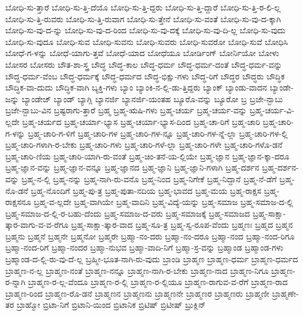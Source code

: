 {ಬೋಧಿ-ಸು-ತ್ತಾರೆ
ಬೋಧಿ-ಸು-ತ್ತಿ-ದೆಯೊ
ಬೋಧಿ-ಸು-ತ್ತಿ-ದ್ದರು
ಬೋಧಿ-ಸು-ತ್ತಿ-ದ್ದಾರೆ
ಬೋಧಿ-ಸು-ತ್ತಿ-ರ-ಲಿ-ಲ್ಲ
ಬೋಧಿ-ಸು-ತ್ತಿ-ರುವರು
ಬೋಧಿ-ಸು-ತ್ತಿ-ರುವಾಗ
ಬೋಧಿ-ಸು-ತ್ತೇನೆ
ಬೋಧಿ-ಸು-ವಂತೆ
ಬೋಧಿ-ಸು-ವು-ದ-ಕ್ಕಾಗಿ
ಬೋಧಿ-ಸು-ವು-ದ-ನ್ನು
ಬೋಧಿ-ಸು-ವು-ದ-ರಿಂದ
ಬೋಧಿ-ಸು-ವು-ದಕ್ಕೆ
ಬೋಧಿ-ಸು-ವು-ದಿ-ಲ್ಲ
ಬೋಧಿ-ಸು-ವುದು
ಬೋಧಿ-ಸು-ವುದೂ
ಬೋಧಿ-ಸುವ
ಬೋಧಿ-ಸುವನು
ಬೋಧಿ-ಸುವರು
ಬೋಧಿ-ಸುವರೋ
ಬೋಧಿ-ಸುವೆ
ಬೋಧಿಸಿ
ಬೋಧೆ-ಗ-ಳನ್ನು
ಬೋಧೆ-ಯಾಗು-ತ್ತವೆ
ಬೋಧೆ-ಯಾದ
ಬೋಧೆಯೂ
ಬೋರ್ಡಿಂಗ್
ಬೋರ್ನಿಯೋ
ಬೋಳು
ಬೋಸರ
ಬೋಸರು
ಬೌತ-ಶಾ-ಸ್ತ್ರ
ಬೌದ್ಧ
ಬೌದ್ಧ-ಕಾಲ
ಬೌದ್ಧ-ಧರ್ಮ
ಬೌದ್ಧ-ಧರ್ಮ-ದಂತೆ
ಬೌದ್ಧ-ಧರ್ಮ-ವನ್ನು
ಬೌದ್ಧ-ಧರ್ಮ-ವೆಂಬ
ಬೌದ್ಧ-ಧರ್ಮಕ್ಕೆ
ಬೌದ್ಧ-ಧರ್ಮದ
ಬೌದ್ಧ-ಭಿಕ್ಷು-ಗಳು
ಬೌದ್ಧ-ರಿಗೆ
ಬೌದ್ಧರ
ಬೌದ್ಧರು
ಬೌದ್ಧಿಕ
ಬೌದ್ಧಿಕ-ವಾ-ದುದು
ಬೌದ್ಧಿಕ-ವಾಗಿ
ಬ್ಯಕ್ತಿ-ಗಳು
ಬ್ಯಾಂ
ಬ್ಯಾಂಕಿ-ನ-ಲ್ಲಿ-ಡು-ತ್ತಿದ್ದರು
ಬ್ಯಾಂಕ್
ಬ್ಯಾಂಡು-ವಾದನ
ಬ್ಯಾಂಡೇ-ಜನ್ನು
ಬ್ಯಾಂಡೇಜ್
ಬ್ಯಾಂಡ್
ಬ್ಯಾಗ್ಲಿ
ಬ್ಯಾನರ್ಜಿ
ಬ್ಯಾನರ್ಜಿ-ಯಂತಹ
ಬ್ಯೂರೊ-ವನ್ನು
ಬ್ಯೂರೋ
ಬ್ರ
ಬ್ರಜೇ-ನ್ಬಾಬು
ಬ್ರಜೇ-ನ್ಬಾಬು-ವಿನ
ಬ್ರಷ್ಟರಾಗು-ತ್ತಾರೆ
ಬ್ರಹ್ಮ
ಬ್ರಹ್ಮ-ಋಷಿ-ಗಳು
ಬ್ರಹ್ಮ-ಚರ್ಯ
ಬ್ರಹ್ಮ-ಚರ್ಯ-ವನ್ನು
ಬ್ರಹ್ಮ-ಚರ್ಯ-ವಿ-ಲ್ಲದೇ
ಬ್ರಹ್ಮ-ಚರ್ಯದ
ಬ್ರಹ್ಮ-ಚರ್ಯಾ-ಭ್ಯಾಸ
ಬ್ರಹ್ಮ-ಚರ್ಯಾ-ಭ್ಯಾಸ-ದಿಂದ
ಬ್ರಹ್ಮ-ಚಾ-ರಿಗೆ
ಬ್ರಹ್ಮ-ಚಾರಿ
ಬ್ರಹ್ಮ-ಚಾರಿ-ಗ-ಳನ್ನು
ಬ್ರಹ್ಮ-ಚಾರಿ-ಗ-ಳಿಗೆ
ಬ್ರಹ್ಮ-ಚಾರಿ-ಗಳ
ಬ್ರಹ್ಮ-ಚಾರಿ-ಗಳ-ನ್ನೂ
ಬ್ರಹ್ಮ-ಚಾರಿ-ಗಳ-ನ್ನೆ-ಲ್ಲಾ
ಬ್ರಹ್ಮ-ಚಾರಿ-ಗಳ-ಲ್ಲಿ
ಬ್ರಹ್ಮ-ಚಾರಿ-ಗಳಾಗಿ-ರ-ಬೇಕು
ಬ್ರಹ್ಮ-ಚಾರಿ-ಗಳು
ಬ್ರಹ್ಮ-ಚಾರಿ-ಗಳೆ-ಲ್ಲಾ
ಬ್ರಹ್ಮ-ಚಾರಿ-ಗಳೇ
ಬ್ರಹ್ಮ-ಚಾರಿ-ಗಳೊ-ಡನೆ
ಬ್ರಹ್ಮ-ಚಾರಿ-ಣಿಯ
ಬ್ರಹ್ಮ-ಚಾರಿ-ಯಾಗಿ-ರು-ವಂತೆ
ಬ್ರಹ್ಮ-ಚಿಂ-ತನೆ-ಯ-ಲ್ಲಿಯೇ
ಬ್ರಹ್ಮ-ಜ್ಞಾನ
ಬ್ರಹ್ಮ-ಜ್ಞಾನ-ಕ್ಕಾ-ದರೂ
ಬ್ರಹ್ಮ-ಜ್ಞಾನ-ವನ್ನು
ಬ್ರಹ್ಮ-ಜ್ಞಾನ-ವನ್ನೂ
ಬ್ರಹ್ಮ-ಜ್ಞಾನದ
ಬ್ರಹ್ಮ-ಜ್ಞಾನಿ
ಬ್ರಹ್ಮ-ಜ್ಞಾನಿ-ಗಳಾಗಿ
ಬ್ರಹ್ಮ-ದರ್ಶನ
ಬ್ರಹ್ಮ-ದರ್ಶನ-ವನ್ನು
ಬ್ರಹ್ಮ-ನ-ಲ್ಲಿ
ಬ್ರಹ್ಮ-ನನ್ನು
ಬ್ರಹ್ಮ-ನಾಗಿ-ರು-ವನೊ
ಬ್ರಹ್ಮ-ನಿಂದ
ಬ್ರಹ್ಮ-ನಿಗೇಕೆ
ಬ್ರಹ್ಮ-ನಿದ್ದಾನೆ
ಬ್ರಹ್ಮ-ನೆ-ಡೆಗೆ
ಬ್ರಹ್ಮ-ನೊ-ಡನೆ
ಬ್ರಹ್ಮ-ನೊಂದಿಗೆ
ಬ್ರಹ್ಮ-ಪು-ತ್ರ
ಬ್ರಹ್ಮ-ಪುತಾ-ನದಿಯ
ಬ್ರಹ್ಮ-ಭಾವದ
ಬ್ರಹ್ಮ-ಮಯ
ಬ್ರಹ್ಮ-ರಾಕ್ಷಸ
ಬ್ರಹ್ಮ-ರಾಕ್ಷಸನೂ
ಬ್ರಹ್ಮ-ವ-ಲ್ಲದೇ
ಬ್ರಹ್ಮ-ವಾಗಿಯೇ
ಬ್ರಹ್ಮ-ವಾದಿನಿ
ಬ್ರಹ್ಮ-ವಿದ್ಯೆ-ಯನ್ನು
ಬ್ರಹ್ಮ-ಸಮಾಜ
ಬ್ರಹ್ಮ-ಸಮಾಜ-ದ-ಲ್ಲಿ
ಬ್ರಹ್ಮ-ಸಮಾಜ-ದ-ಲ್ಲಿ-ರ-ಬಹು-ದೆಂದು
ಬ್ರಹ್ಮ-ಸಮಾಜ-ದ-ವರು
ಬ್ರಹ್ಮ-ಸಮಾಜಕ್ಕೆ
ಬ್ರಹ್ಮ-ಸಮಾಜದ
ಬ್ರಹ್ಮ-ಸಾಕ್ಷಾ-ತ್ಕಾರ-ವಾಗು-ವ-ವ-ರೆಗೂ
ಬ್ರಹ್ಮ-ಸಾಕ್ಷಾ-ತ್ಕಾರ-ವಾದ
ಬ್ರಹ್ಮ-ಸೂ-ತ್ರ
ಬ್ರಹ್ಮ-ಸ್ವ-ರೂಪ-ವೆಂದು
ಬ್ರಹ್ಮಣಃ
ಬ್ರಹ್ಮದ
ಬ್ರಹ್ಮನ
ಬ್ರಹ್ಮನು
ಬ್ರಹ್ಮನೆ
ಬ್ರಹ್ಮನೇ
ಬ್ರಹ್ಮನೋ
ಬ್ರಹ್ಮರೇ
ಬ್ರಹ್ಮಾ-ನಂ-ದರು
ಬ್ರಹ್ಮಾ-ನಂ-ದರೂ
ಬ್ರಹ್ಮಾ-ನಂದ
ಬ್ರಹ್ಮಾ-ನಂದ-ರಿಗೂ
ಬ್ರಹ್ಮಾ-ನಂದ-ರಿಗೆ
ಬ್ರಹ್ಮಾ-ನಂದರ
ಬ್ರಹ್ಮಾ-ನುಭವ
ಬ್ರಹ್ಮಾ-ವಾದಿ-ನಿಗೆ
ಬ್ರಹ್ಮಾ-ಸ್ರ-ವನ್ನು
ಬ್ರಹ್ಮಾಂಡ
ಬ್ರಹ್ಮಾಂಡ-ಗಳು
ಬ್ರಹ್ಮಾಂಡ-ದ-ಲ್ಲಿ-ರು-ವು-ದೆ-ಲ್ಲ
ಬ್ರಹ್ಮೀ-ಭೂತ-ನಾಗಿ-ರು-ವುದು
ಬ್ರಾಂಡಿ
ಬ್ರಾಹ್ಮಣ
ಬ್ರಾಹ್ಮಣ-ಧರ್ಮ
ಬ್ರಾಹ್ಮಣ-ಧರ್ಮದ
ಬ್ರಾಹ್ಮಣ-ನ-ಲ್ಲ
ಬ್ರಾಹ್ಮಣ-ನಂತೆ
ಬ್ರಾಹ್ಮಣ-ನನ್ನೂ
ಬ್ರಾಹ್ಮಣ-ನಾಗಿ-ರ-ಬೇಕು
ಬ್ರಾಹ್ಮಣ-ನಾದ
ಬ್ರಾಹ್ಮಣ-ನಿಗೂ
ಬ್ರಾಹ್ಮಣ-ರ-ನ್ನಾಗಿ
ಬ್ರಾಹ್ಮಣ-ರ-ಲ್ಲ-ವೆಂದೂ
ಬ್ರಾಹ್ಮಣ-ರ-ಲ್ಲಿ
ಬ್ರಾಹ್ಮಣ-ರ-ಲ್ಲಿಯೂ
ಬ್ರಾಹ್ಮಣ-ರಾಗುವ-ವ-ರೆಗೆ
ಬ್ರಾಹ್ಮಣ-ರಾದ
ಬ್ರಾಹ್ಮಣ-ರಿಂದ
ಬ್ರಾಹ್ಮಣ-ರೊ-ಡನೆ
ಬ್ರಾಹ್ಮಣನ
ಬ್ರಾಹ್ಮಣನು
ಬ್ರಾಹ್ಮಣನೇ
ಬ್ರಾಹ್ಮಣರ
ಬ್ರಾಹ್ಮಣರು
ಬ್ರಾಹ್ಮಣೀ
ಬ್ರಾಹ್ಮಣೇ-ತರ
ಬ್ರಾಹ್ಮೋ
ಬ್ರಿಟಾ-ನಿಗೆ
ಬ್ರಿಟಾನಿ-ಯಿಂದ
ಬ್ರಿಟಾನಿಕ
ಬ್ರಿಟಿಷ್
ಬ್ರಿಟೀಷ್
ಬ್ರುಕ್ಲಿನ್
}
